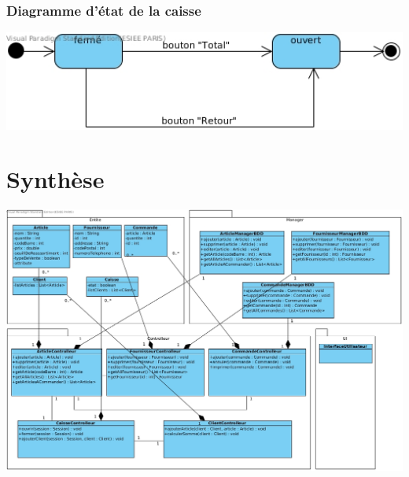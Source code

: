 \subsection{Diagramme d'état de la caisse}
\begin{center}
	\includegraphics[width=14cm]{Analyse/DiagrammeEtatCaisse.jpg}
\end{center}


\chapter{Synthèse}
\begin{center}
	\includegraphics[width=15cm]{Analyse/DiagrammeDeClasse.jpg}
\end{center}


	
